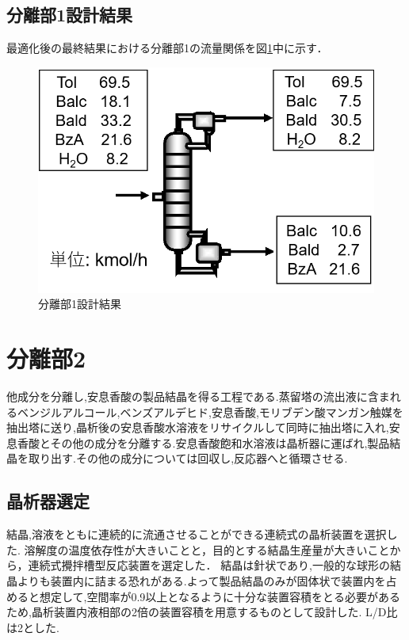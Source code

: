 \documentclass[a4j]{jsreport}
\begin{document}
\section{分離部1設計結果}
最適化後の最終結果における分離部1の流量関係を図\ref{分離部1設計結果の図}中に示す．
\begin{figure}[htbp]
  \centering
  \includegraphics[scale=0.7]{Separation1Conclusion.png}
  \caption{分離部1設計結果}
  \label{分離部1設計結果の図}
\end{figure}


\clearpage
\chapter{分離部2}
他成分を分離し,安息香酸の製品結晶を得る工程である.蒸留塔の流出液に含まれるベンジルアルコール,ベンズアルデヒド,安息香酸,モリブデン酸マンガン触媒を抽出塔に送り,晶析後の安息香酸水溶液をリサイクルして同時に抽出塔に入れ,安息香酸とその他の成分を分離する.安息香酸飽和水溶液は晶析器に運ばれ,製品結晶を取り出す.その他の成分については回収し,反応器へと循環させる.

\section{晶析器選定}
結晶,溶液をともに連続的に流通させることができる連続式の晶析装置を選択した.
溶解度の温度依存性が大きいことと，目的とする結晶生産量が大きいことから，連続式攪拌槽型反応装置を選定した．
結晶は針状であり,一般的な球形の結晶よりも装置内に詰まる恐れがある\cite{化工便覧}.よって製品結晶のみが固体状で装置内を占めると想定して,空間率が0.9以上となるように十分な装置容積をとる必要があるため,晶析装置内液相部の2倍の装置容積を用意するものとして設計した.
L/D比は2とした.
\end{document}
